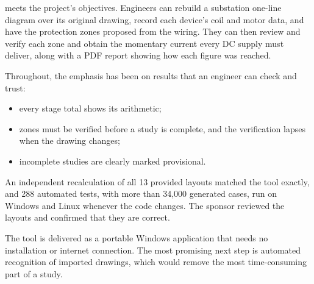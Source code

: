 \app{} meets the project's objectives. Engineers can rebuild a substation one-line
diagram over its original drawing, record each device's coil and motor data, and have
the protection zones proposed from the wiring. They can then review and verify each
zone and obtain the momentary current every DC supply must deliver, along with a PDF
report showing how each figure was reached.

Throughout, the emphasis has been on results that an engineer can check and trust:
\begin{itemize}
  \item every stage total shows its arithmetic;
  \item zones must be verified before a study is complete, and the verification
        lapses when the drawing changes;
  \item incomplete studies are clearly marked provisional.
\end{itemize}
An independent recalculation of all 13 provided layouts matched the tool exactly, and
288 automated tests, with more than 34{,}000 generated cases, run on Windows and Linux
whenever the code changes. The sponsor reviewed the layouts and confirmed that they are
correct.

The tool is delivered as a portable Windows application that needs no installation or
internet connection. The most promising next step is automated recognition of
imported drawings, which would remove the most time-consuming part of a study.
